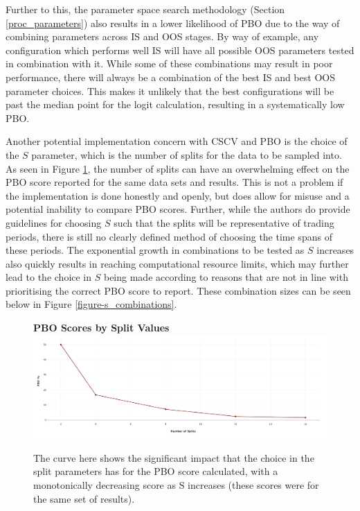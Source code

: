\documentclass[a4paper,11pt,oneside]{article}
\theoremstyle{plain}
\theoremstyle{definition}
\begin{document}
	Further to this, the parameter space search methodology (Section \ref{proc_parameters}) also results in a lower likelihood of PBO due to the way of combining parameters across IS and OOS stages. By way of example, any configuration which performs well IS will have all possible OOS parameters tested in combination with it. While some of these combinations may result in poor performance, there will always be a combination of the best IS and best OOS parameter choices. This makes it unlikely that the best configurations will be past the median point for the logit calculation, resulting in a systematically low PBO.\newline
	
	Another potential implementation concern with CSCV and PBO is the choice of the $S$ parameter, which is the number of splits for the data to be sampled into. As seen in Figure \ref{figure-PBO_by_Split}, the number of splits can have an overwhelming effect on the PBO score reported for the same data sets and results. This is not a problem if the implementation is done honestly and openly, but does allow for misuse and a potential inability to compare PBO scores. Further, while the authors do provide guidelines for choosing $S$ such that the splits will be representative of trading periods, there is still no clearly defined method of choosing the time spans of these periods. The exponential growth in combinations to be tested as $S$ increases also quickly results in reaching computational resource limits, which may further lead to the choice in $S$ being made according to reasons that are not in line with prioritising the correct PBO score to report. These combination sizes can be seen below in Figure \ref{figure-s_combinations}.
	
	\begin{figure}[H]
		\centering 
		\textbf{PBO Scores by Split Values}
		\includegraphics[scale=0.25]{images/results/pbo/PBO_by_Split.png} 
		\caption[PBO Scores by Split Values]{
			\newline The curve here shows the significant impact that the choice in the split parameters has for the PBO score calculated, with a monotonically decreasing score as S increases (these scores were for the same set of results). }
		\label{figure-PBO_by_Split}
	\end{figure}
	
\end{document}
